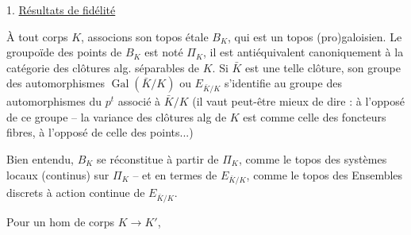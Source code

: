 {}


1. \uline{Résultats de fidélité}

À tout corps $K$, associons son topos étale $B_K$, qui est un topos (pro)galoisien. Le groupoïde des points de $B_K$ est noté $\Pi_K$, il est antiéquivalent canoniquement à la catégorie des clôtures alg. séparables de $K$. Si $\bar K$ est une telle clôture, son groupe des automorphismes $\operatorname{Gal}(\bar K/K)$ ou $E_{\bar K/K}$ s'identifie au groupe des automorphismes du $p^t$  associé à $\bar K/K$ (il vaut peut-être mieux de dire : à l'opposé de ce groupe --  la variance des clôtures alg de $K$ est comme celle des foncteurs fibres, à l'opposé de celle des points...)

Bien entendu, $B_K$ se réconstitue à partir de $\Pi_K$, comme le topos des systèmes locaux (continus) sur $\Pi_K$ -- et en termes de $E_{\bar K/K}$, comme le topos des Ensembles discrets à action continue de $E_{\bar K/K}$.

Pour un hom de corps $K\longrightarrow K'$,

